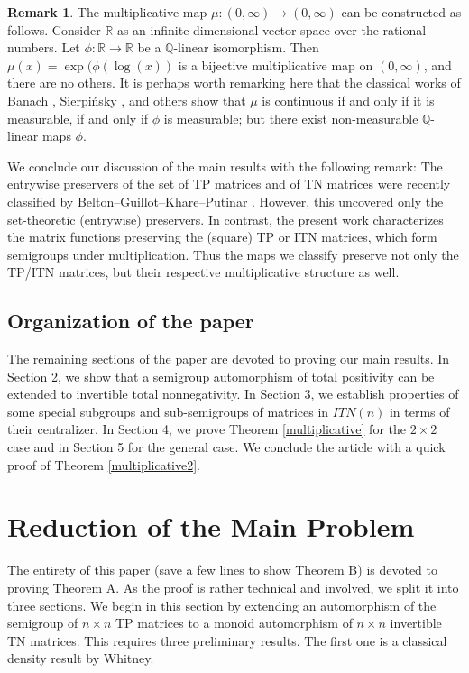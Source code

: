 \documentclass[11pt,reqno]{amsart}
\theoremstyle{plain}
\newcommand{\IR}{\mathbb{R}}
\theoremstyle{definition}
\newtheorem{rem}[theorem]{Remark}
\numberwithin{equation}{section}
\begin{document}
\begin{rem}
The multiplicative map $\mu: (0, \infty) \to (0, \infty)$ can be constructed as follows.  
Consider $\IR$ as an infinite-dimensional vector space over the rational
numbers. Let $\phi : \mathbb{R} \to \mathbb{R}$ be a $\mathbb{Q}$-linear isomorphism. Then $\mu(x) = \exp(\phi(\log(x))$ 
is a bijective multiplicative map on $(0,\infty)$, and there are no others. It is perhaps worth remarking here that the classical works of Banach \cite{Banach}, Sierpi\'nsky \cite{Sierpinsky}, and others show that $\mu$ is continuous if and only if it is measurable, if and only if $\phi$ is measurable; but there exist non-measurable $\mathbb{Q}$-linear maps $\phi$.
\end{rem}


We conclude our discussion of the main results with the following remark: The entrywise preservers of the set of TP matrices and of TN matrices were recently classified by Belton--Guillot--Khare--Putinar \cite{BGKP20}. However, this uncovered only the set-theoretic (entrywise) preservers. In contrast, the present work characterizes the matrix functions preserving  the (square) TP or ITN matrices, which form semigroups under multiplication. Thus the maps we classify preserve not only the TP/ITN matrices, but their respective multiplicative structure as well.

\medskip
\subsection*{Organization of the paper} The remaining sections of the paper are devoted to proving our main results. In Section 2, we show that a semigroup automorphism of total positivity can be extended to invertible total nonnegativity. In Section 3, we establish properties of some special subgroups and sub-semigroups  of matrices in $ITN(n)$ in terms of their centralizer. In Section 4, we prove Theorem \ref{multiplicative} for the $2\times 2$ case and in Section 5 for the general case.  We conclude the article with a quick proof of Theorem \ref{multiplicative2}.

\section{Reduction of the Main Problem}

The entirety of this paper (save a few lines to show Theorem B) is devoted to proving Theorem A. As the proof is rather technical and involved, we split it into three sections. We begin in this section by extending an automorphism of the semigroup of $n \times n$ TP matrices to a monoid automorphism of $n \times n$ invertible TN matrices. This requires three preliminary results.  The first one is a classical density result by Whitney.
\end{document}
